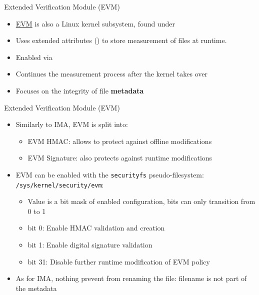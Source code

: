 \begin{frame}{Extended Verification Module (EVM)}
  \begin{itemize}
    \item \href{https://ima-doc.readthedocs.io/en/latest/ima-concepts.html\#extended-verification-module-evm}{EVM}
          is also a Linux kernel subsystem, found under 
    \item Uses extended attributes () to store
          measurement of files at runtime.
    \item Enabled via 
    \item Continues the measurement process after the kernel takes over
    \item Focuses on the integrity of file \textbf{metadata}
  \end{itemize}
\end{frame}

\begin{frame}{Extended Verification Module (EVM)}
  \begin{itemize}
    \item Similarly to IMA, EVM is split into:
    \begin{itemize}
      \item EVM HMAC: allows to protect against offline modifications
      \item EVM Signature: also protects against runtime modifications
    \end{itemize}
  \item EVM can be enabled with the \texttt{securityfs} pseudo-filesystem:
    \texttt{/sys/kernel/security/evm}:
      \begin{itemize}
        \item Value is a bit mask of enabled configuration, bits can only
          transition from 0 to 1
        \item bit 0: Enable HMAC validation and creation
        \item bit 1: Enable digital signature validation
        \item bit 31: Disable further runtime modification of EVM policy
      \end{itemize}
    \item As for IMA, nothing prevent from renaming the file: filename is not
      part of the metadata
  \end{itemize}
\end{frame}

